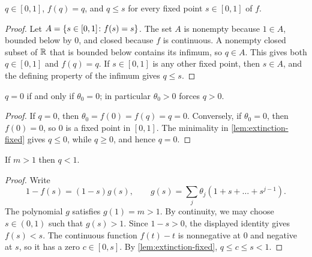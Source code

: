 \begin{lemma}
\label{lem:extinction-fixed}
\leanok
$q\in[0,1]$, $f(q)=q$, and $q\leq s$ for every fixed point $s\in[0,1]$ of $f$.
\end{lemma}

\begin{proof}
\leanok
Let $A=\{s\in[0,1]\colon f(s)=s\}$. The set $A$ is nonempty because $1\in A$, bounded
below by $0$, and closed because $f$ is continuous. A nonempty closed subset of
$\mathbb{R}$ that is bounded below contains its infimum, so $q\in A$. This gives both
$q\in[0,1]$ and $f(q)=q$. If $s\in[0,1]$ is any other fixed point, then $s\in A$, and the
defining property of the infimum gives $q\leq s$.
\end{proof}

\begin{lemma}
\label{lem:extinction-zero}
\leanok
$q=0$ if and only if $\theta_0=0$; in particular $\theta_0>0$ forces $q>0$.
\end{lemma}

\begin{proof}
\leanok
If $q=0$, then
$\theta_0=f(0)=f(q)=q=0$. Conversely, if $\theta_0=0$, then $f(0)=0$, so $0$ is a fixed
point in $[0,1]$. The minimality in \cref{lem:extinction-fixed} gives $q\leq0$, while
$q\geq0$, and hence $q=0$.
\end{proof}

\begin{theorem}
\label{thm:supercritical}
\leanok
If $m>1$ then $q<1$.
\end{theorem}

\begin{proof}
\leanok
Write
\[
  1-f(s)=(1-s)g(s),
  \qquad
  g(s)=\sum_j\theta_j(1+s+\dots+s^{j-1}).
\]
The polynomial $g$ satisfies $g(1)=m>1$. By continuity, we may choose $s\in(0,1)$ such
that $g(s)>1$. Since $1-s>0$, the displayed identity gives $f(s)<s$. The continuous
function $f(t)-t$ is nonnegative at $0$ and negative at $s$, so it has a zero
$c\in[0,s]$. By \cref{lem:extinction-fixed}, $q\leq c\leq s<1$.
\end{proof}
